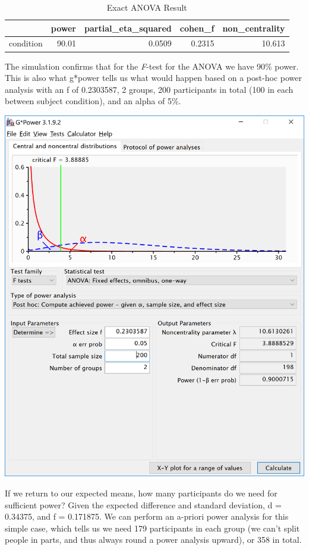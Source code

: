 \documentclass[]{book}
\begin{document}
\begin{table}[!h]

\caption{\label{tab:unnamed-chunk-21}Exact ANOVA Result}
\centering
\begin{tabular}{l|r|r|r|r}
\hline
  & power & partial\_eta\_squared & cohen\_f & non\_centrality\\
\hline
condition & 90.01 & 0.0509 & 0.2315 & 10.613\\
\hline
\end{tabular}
\end{table}

The simulation confirms that for the \emph{F}-test for the ANOVA we have 90\% power. This is also what g*power tells us what would happen based on a post-hoc power analysis with an f of 0.2303587, 2 groups, 200 participants in total (100 in each between subject condition), and an alpha of 5\%.

\includegraphics{screenshots/gpower_8.png}

If we return to our expected means, how many participants do we need for sufficient power? Given the expected difference and standard deviation, d = 0.34375, and f = 0.171875. We can perform an a-priori power analysis for this simple case, which tells us we need 179 participants in each group (we can't split people in parts, and thus always round a power analysis upward), or 358 in total.
\end{document}
